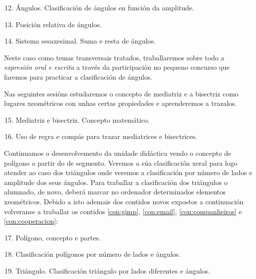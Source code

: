 \begin{enumerate}[label=\bfseries Con\arabic*, align=left, leftmargin=1.5cm]
  \setcounter{enumi}{11}
  \item\label{con:angulos} Ángulos. Clasificación de ángulos en función da amplitude.
  \item\label{con:posicionangulos} Posición relativa de ángulos.
  \item\label{con:sexasesimal} Sistema sesaxesimal. Suma e resta de ángulos.
\end{enumerate}

Neste caso como temas transversais tratados, traballaremos sobre todo a \emph{expresión oral e escrita} a través da participación no pequeno concurso que faremos para practicar a clasificación de ángulos.

Nas seguintes sesións estudaremos o concepto de mediatriz e a bisectriz como lugares xeométricos con unhas certas propiedades e aprenderemos a trazalos.

\begin{enumerate}[label=\bfseries Con\arabic*, align=left, leftmargin=1.5cm]
    \setcounter{enumi}{14}
    \item\label{con:mediatrizconp} Mediatriz e bisectriz. Concepto matemático.
    \item\label{con:mediatriztraz} Uso de regra e compás para trazar mediatrices e bisectrices.
\end{enumerate}

Continuamos o desenvolvemento da unidade didáctica vendo o concepto de polígono a partir do de segmento. Veremos a súa clasificación xeral para logo atender ao caso dos triángulos onde veremos a clasificación por número de lados e amplitude dos seus ángulos. Para traballar a clasificación dos triángulos o alumnado, de novo, deberá marcar no ordenador determinados elementos xeométricos. Debido a isto ademais dos contidos novos expostos a continuación volveranse a traballar os contidos \ref{con:gimp}, \ref{con:email}, \ref{con:companheiros} e \ref{con:cooperacion}:

\begin{enumerate}[label=\bfseries Con\arabic*, align=left, leftmargin=1.5cm]
  \setcounter{enumi}{16}
  \item\label{con:poligono} Polígono, concepto e partes.
  \item\label{con:clasificacionpol} Clasificación polígonos por número de lados e ángulos.
  \item\label{con:triangulo} Triángulo. Clasificación triángulo por lados diferentes e ángulos.
\end{enumerate}

